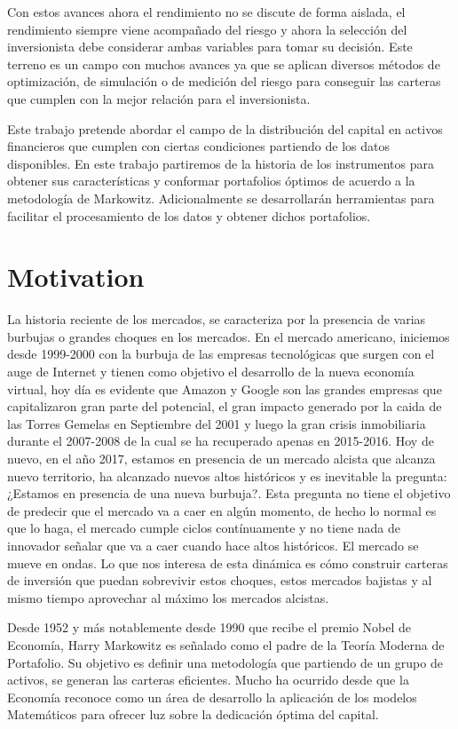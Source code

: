 \documentclass[
  12pt,
]{krantz}
\begin{document}
Con estos avances ahora el rendimiento no se discute de forma aislada, el rendimiento siempre viene acompañado del riesgo y ahora la selección del inversionista debe considerar ambas variables para tomar su decisión. Este terreno es un campo con muchos avances ya que se aplican diversos métodos de optimización, de simulación o de medición del riesgo para conseguir las carteras que cumplen con la mejor relación para el inversionista.

Este trabajo pretende abordar el campo de la distribución del capital en activos financieros que cumplen con ciertas condiciones partiendo de los datos disponibles. En este trabajo partiremos de la historia de los instrumentos para obtener sus características y conformar portafolios óptimos de acuerdo a la metodología de Markowitz. Adicionalmente se desarrollarán herramientas para facilitar el procesamiento de los datos y obtener dichos portafolios.

\hypertarget{motivation}{%
\section{Motivation}\label{motivation}}

La historia reciente de los mercados, se caracteriza por la presencia de varias burbujas o grandes choques en los mercados. En el mercado americano, iniciemos desde 1999-2000 con la burbuja de las empresas tecnológicas que surgen con el auge de Internet y tienen como objetivo el desarrollo de la nueva economía virtual, hoy día es evidente que Amazon y Google son las grandes empresas que capitalizaron gran parte del potencial, el gran impacto generado por la caida de las Torres Gemelas en Septiembre del 2001 y luego la gran crisis inmobiliaria durante el 2007-2008 de la cual se ha recuperado apenas en 2015-2016. Hoy de nuevo, en el año 2017, estamos en presencia de un mercado alcista que alcanza nuevo territorio, ha alcanzado nuevos altos históricos y es inevitable la pregunta: ¿Estamos en presencia de una nueva burbuja?. Esta pregunta no tiene el objetivo de predecir que el mercado va a caer en algún momento, de hecho lo normal es que lo haga, el mercado cumple ciclos contínuamente y no tiene nada de innovador señalar que va a caer cuando hace altos históricos. El mercado se mueve en ondas. Lo que nos interesa de esta dinámica es cómo construir carteras de inversión que puedan sobrevivir estos choques, estos mercados bajistas y al mismo tiempo aprovechar al máximo los mercados alcistas.

Desde 1952 y más notablemente desde 1990 que recibe el premio Nobel de Economía, Harry Markowitz es señalado como el padre de la Teoría Moderna de Portafolio. Su objetivo es definir una metodología que partiendo de un grupo de activos, se generan las carteras eficientes. Mucho ha ocurrido desde que la Economía reconoce como un área de desarrollo la aplicación de los modelos Matemáticos para ofrecer luz sobre la dedicación óptima del capital.
\end{document}
